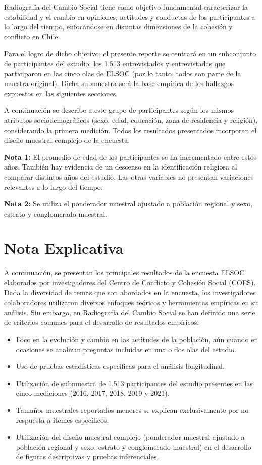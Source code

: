 \documentclass[
  12pt,
]{book}
\providecommand{\tightlist}{%
  \setlength{\itemsep}{0pt}\setlength{\parskip}{0pt}}
\begin{document}
Radiografía del Cambio Social tiene como objetivo fundamental caracterizar la estabilidad y el cambio en opiniones, actitudes y conductas de los participantes a lo largo del tiempo, enfocándose en distintas dimensiones de la cohesión y conflicto en Chile.

Para el logro de dicho objetivo, el presente reporte se centrará en un subconjunto de participantes del estudio: los 1.513 entrevistados y entrevistadas que participaron en las cinco olas de ELSOC (por lo tanto, todos son parte de la muestra original). Dicha submuestra será la base empírica de los hallazgos expuestos en las siguientes secciones.

A continuación se describe a este grupo de participantes según los mismos atributos sociodemográficos (sexo, edad, educación, zona de residencia y religión), considerando la primera medición. Todos los resultados presentados incorporan el diseño muestral complejo de la encuesta.

\textbf{Nota 1:} El promedio de edad de los participantes se ha incrementado entre estos años. También hay evidencia de un descenso en la identificación religiosa al comparar distintos años del estudio. Las otras variables no presentan variaciones relevantes a lo largo del tiempo.

\textbf{Nota 2:} Se utiliza el ponderador muestral ajustado a población regional y sexo, estrato y conglomerado muestral.

\hypertarget{nota-explicativa}{%
\section{Nota Explicativa}\label{nota-explicativa}}

A continuación, se presentan los principales resultados de la encuesta ELSOC elaborados por investigadores del Centro de Conflicto y Cohesión Social (COES). Dada la diversidad de temas que son abordados en la encuesta, los investigadores colaboradores utilizaron diversos enfoques teóricos y herramientas empíricas en su análisis. Sin embargo, en Radiografía del Cambio Social se han definido una serie de criterios comunes para el desarrollo de resultados empíricos:

\begin{itemize}
\tightlist
\item
  Foco en la evolución y cambio en las actitudes de la población, aún cuando en ocasiones se analizan preguntas incluidas en una o dos olas del estudio.
\item
  Uso de pruebas estadísticas específicas para el análisis longitudinal.
\item
  Utilización de submuestra de 1.513 participantes del estudio presentes en las cinco mediciones (2016, 2017, 2018, 2019 y 2021).
\item
  Tamaños muestrales reportados menores se explican exclusivamente por no respuesta a ítemes específicos.
\item
  Utilización del diseño muestral complejo (ponderador muestral ajustado a población regional y sexo, estrato y conglomerado muestral) en el desarrollo de figuras descriptivas y pruebas inferenciales.
\end{itemize}
\end{document}
